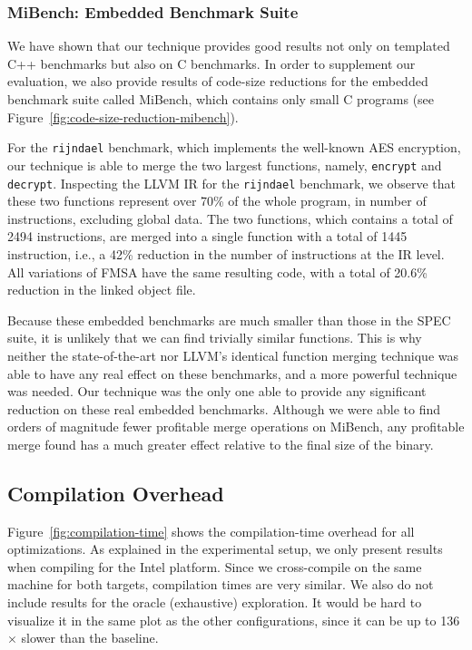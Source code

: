 \subsubsection{MiBench: Embedded Benchmark Suite}

We have shown that our technique provides good results not only on templated C++
benchmarks but also on C benchmarks.
In order to supplement our evaluation, we also provide results of code-size
reductions for the embedded benchmark suite called MiBench, which contains only
small C programs (see Figure~\ref{fig:code-size-reduction-mibench}).

For the \texttt{rijndael} benchmark, which implements the well-known AES
encryption, our technique is able to merge the two largest functions, namely,
\texttt{encrypt} and \texttt{decrypt}.
Inspecting the LLVM IR for the \texttt{rijndael} benchmark, we observe that
these two functions represent over 70\% of the whole program, in number of
instructions, excluding global data.
The two functions, which contains a total of 2494 instructions, are merged into
a single function with a total of 1445 instruction, i.e., a 42\% reduction in
the number of instructions at the IR level. All variations of FMSA have the same
resulting code, with a total of 20.6\% reduction in the linked object file.


Because these embedded benchmarks are much smaller than those in the SPEC suite, it is unlikely that we can find trivially similar functions.
This is why neither the state-of-the-art nor LLVM's identical function merging technique was able to have any real effect on these benchmarks, and a more powerful technique was needed.
Our technique was the only one able to provide any significant reduction on these real embedded benchmarks.
Although we were able to find orders of magnitude fewer profitable merge operations on MiBench, any profitable merge found has a much greater effect relative to the final size of the binary.

\subsection{Compilation Overhead}


Figure~\ref{fig:compilation-time} shows the compilation-time overhead for all optimizations. As explained in the experimental setup, we
only present results when compiling for the Intel platform. Since we cross-compile on the same machine for both targets, compilation times
are very similar. We also do not include results for the oracle (exhaustive) exploration. It would be hard to visualize it in the same plot
as the other configurations, since it can be up to 136$\times$ slower than the baseline.

